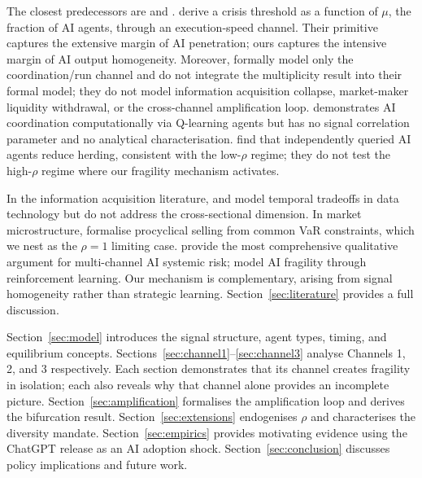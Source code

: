 The closest predecessors are \citet{danielsson2025} and \citet{yang2024}. \citet{danielsson2025} derive a crisis threshold as a function of $\mu$, the fraction of AI agents, through an execution-speed channel. Their primitive captures the extensive margin of AI penetration; ours captures the intensive margin of AI output homogeneity. Moreover, \citet{danielsson2025} formally model only the coordination/run channel and do not integrate the \citet{hellwig2002} multiplicity result into their formal model; they do not model information acquisition collapse, market-maker liquidity withdrawal, or the cross-channel amplification loop. \citet{yang2024} demonstrates AI coordination computationally via Q-learning agents but has no signal correlation parameter and no analytical characterisation. \citet{hansen2025} find that independently queried AI agents reduce herding, consistent with the low-$\rho$ regime; they do not test the high-$\rho$ regime where our fragility mechanism activates.

In the information acquisition literature, \citet{dugast2018} and \citet{farboodi2020} model temporal tradeoffs in data technology but do not address the cross-sectional dimension. In market microstructure, \citet{danielsson2012} formalise procyclical selling from common VaR constraints, which we nest as the $\rho = 1$ limiting case. \citet{danielsson2022} provide the most comprehensive qualitative argument for multi-channel AI systemic risk; \citet{dou2025a, dou2025b} model AI fragility through reinforcement learning. Our mechanism is complementary, arising from signal homogeneity rather than strategic learning. Section~\ref{sec:literature} provides a full discussion.

Section~\ref{sec:model} introduces the signal structure, agent types, timing, and equilibrium concepts. Sections~\ref{sec:channel1}--\ref{sec:channel3} analyse Channels 1, 2, and 3 respectively. Each section demonstrates that its channel creates fragility in isolation; each also reveals why that channel alone provides an incomplete picture. Section~\ref{sec:amplification} formalises the amplification loop and derives the bifurcation result. Section~\ref{sec:extensions} endogenises $\rho$ and characterises the diversity mandate. Section~\ref{sec:empirics} provides motivating evidence using the ChatGPT release as an AI adoption shock. Section~\ref{sec:conclusion} discusses policy implications and future work.
